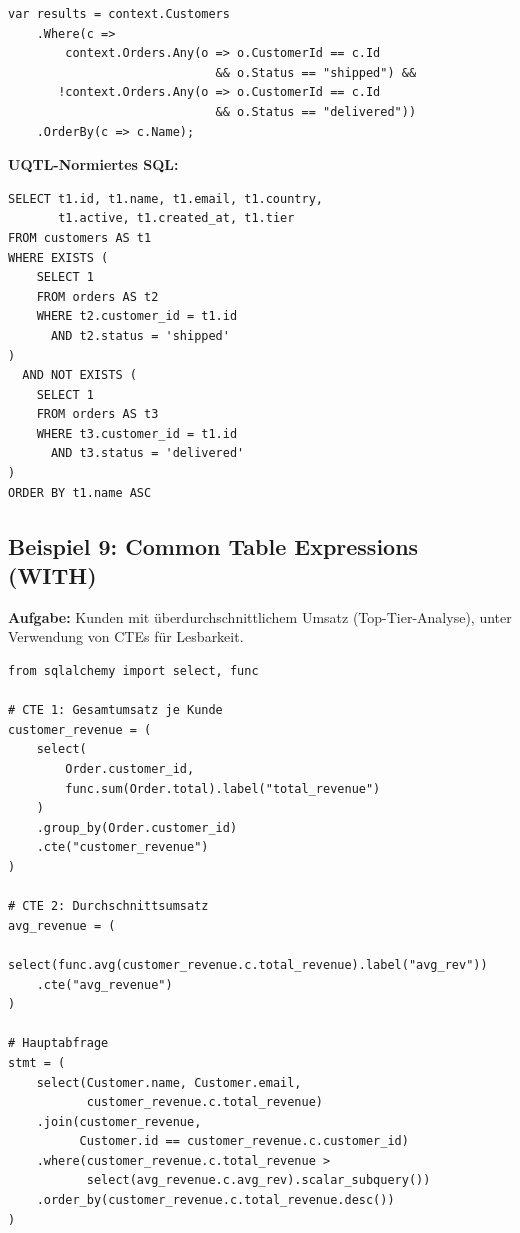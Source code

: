 \begin{lstlisting}[style=csharpstyle, caption={Beispiel 8 -- C\# (EXISTS via Any)},
  label=lst:bsp8_cs]
var results = context.Customers
    .Where(c =>
        context.Orders.Any(o => o.CustomerId == c.Id
                             && o.Status == "shipped") &&
       !context.Orders.Any(o => o.CustomerId == c.Id
                             && o.Status == "delivered"))
    .OrderBy(c => c.Name);
\end{lstlisting}

\begin{successbox}
\textbf{UQTL-Normiertes SQL:}
\begin{lstlisting}[style=sqlstyle, numbers=none]
SELECT t1.id, t1.name, t1.email, t1.country,
       t1.active, t1.created_at, t1.tier
FROM customers AS t1
WHERE EXISTS (
    SELECT 1
    FROM orders AS t2
    WHERE t2.customer_id = t1.id
      AND t2.status = 'shipped'
)
  AND NOT EXISTS (
    SELECT 1
    FROM orders AS t3
    WHERE t3.customer_id = t1.id
      AND t3.status = 'delivered'
)
ORDER BY t1.name ASC
\end{lstlisting}
\end{successbox}

\subsection{Beispiel 9: Common Table Expressions (WITH)}
\label{subsec:bsp9}

\textbf{Aufgabe:} Kunden mit überdurchschnittlichem Umsatz (Top-Tier-Analyse),
unter Verwendung von CTEs für Lesbarkeit.

\begin{lstlisting}[style=pythonstyle, caption={Beispiel 9 -- Python (CTE)},
  label=lst:bsp9_py]
from sqlalchemy import select, func

# CTE 1: Gesamtumsatz je Kunde
customer_revenue = (
    select(
        Order.customer_id,
        func.sum(Order.total).label("total_revenue")
    )
    .group_by(Order.customer_id)
    .cte("customer_revenue")
)

# CTE 2: Durchschnittsumsatz
avg_revenue = (
    select(func.avg(customer_revenue.c.total_revenue).label("avg_rev"))
    .cte("avg_revenue")
)

# Hauptabfrage
stmt = (
    select(Customer.name, Customer.email,
           customer_revenue.c.total_revenue)
    .join(customer_revenue,
          Customer.id == customer_revenue.c.customer_id)
    .where(customer_revenue.c.total_revenue >
           select(avg_revenue.c.avg_rev).scalar_subquery())
    .order_by(customer_revenue.c.total_revenue.desc())
)
\end{lstlisting}

